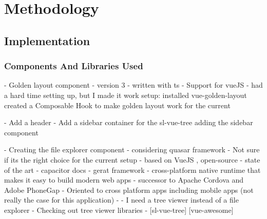 \chapter{Methodology}

\section{Implementation}


\subsection{Components And Libraries Used}

- Golden layout component
- version 3 - written with ts
- Support for vueJS
- had a hard time setting up, but I made it work
setup: 
installed vue-golden-layout
created a Composable Hook to make golden layout work for the current 

- Add a header 
- Add a sidebar container for the sl-vue-tree
adding the sidebar component 


- Creating the file explorer component
- considering quasar framework
- Not sure if its the right choice for the current setup
- based on VueJS , open-source
- state of the art 
- capacitor docs 
- gerat framework 
- cross-platform native runtime that makes it easy to build modern web apps
- successor to Apache Cordova and Adobe PhoneGap
- Oriented to cross platform apps including mobile apps (not really the case for this application)
- 
- I need a tree viewer instead of a file explorer - Checking out tree viewer
libraries 
- [sl-vue-tree] [vue-awesome] 




